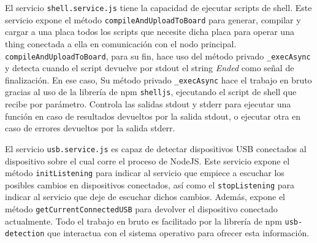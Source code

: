 \vspace{1cm}
 
El servicio \verb|shell.service.js| tiene la capacidad de ejecutar scripts de shell. Este servicio expone el método \verb|compileAndUploadToBoard| para generar, compilar y cargar a una placa todos los scripts que necesite dicha placa para operar una thing conectada a ella en comunicación con el nodo principal. \verb|compileAndUploadToBoard|, para su fin, hace uso del método privado \verb|_execAsync| y detecta cuando el script devuelve por stdout el string \textit{Ended} como señal de finalización. En ese caso, 
Su método privado \verb|_execAsync| hace el trabajo en bruto gracias al uso de la librería de npm \verb|shelljs|, ejecutando el script de shell que recibe por parámetro. Controla las salidas stdout y stderr para ejecutar una función en caso de resultados devueltos por la salida stdout, o ejecutar otra en caso de errores devueltos por la salida stderr.

\vspace{1cm}

El servicio \verb|usb.service.js| es capaz de detectar dispositivos USB conectados al dispositivo sobre el cual corre el proceso de NodeJS.
Este servicio expone el método \verb|initListening| para indicar al servicio que empiece a escuchar los posibles cambios en dispositivos conectados, así como el \verb|stopListening| para indicar al servicio que deje de escuchar dichos cambios. Además, expone el método \verb|getCurrentConnectedUSB| para devolver el dispositivo conectado actualmente. Todo el trabajo en bruto es facilitado por la librería de npm  \verb|usb-detection| que interactua con el sistema operativo para ofrecer esta información.
